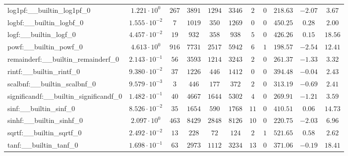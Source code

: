 \begin{tabular}{|l|c|c|c|c|c|c|c|c|c|c|}
log1pf:\_\_builtin\_log1pf\_0             & $ 1.221 \cdot 10^{0}  $ & $ 267    $ & $ 3891   $ & $ 1294  $ & $ 3346   $ & $ 2   $ & $ 0 $ & $ 218.63      $ & $ -2.07   $ & $ 3.67    $ \\
logbf:\_\_builtin\_logbf\_0               & $ 1.555 \cdot 10^{-2} $ & $ 7      $ & $ 1019   $ & $ 350   $ & $ 1269   $ & $ 0   $ & $ 0 $ & $ 450.25      $ & $ 0.28    $ & $ 2.00    $ \\
logf:\_\_builtin\_logf\_0                 & $ 4.457 \cdot 10^{-2} $ & $ 19     $ & $ 932    $ & $ 358   $ & $ 938    $ & $ 5   $ & $ 0 $ & $ 426.26      $ & $ 0.15    $ & $ 18.56   $ \\
powf:\_\_builtin\_powf\_0                 & $ 4.613 \cdot 10^{0}  $ & $ 916    $ & $ 7731   $ & $ 2517  $ & $ 5942   $ & $ 6   $ & $ 1 $ & $ 198.57      $ & $ -2.54   $ & $ 12.41   $ \\
remainderf:\_\_builtin\_remainderf\_0     & $ 2.143 \cdot 10^{-1} $ & $ 56     $ & $ 3593   $ & $ 1214  $ & $ 3243   $ & $ 2   $ & $ 0 $ & $ 261.37      $ & $ -1.33   $ & $ 3.32    $ \\
rintf:\_\_builtin\_rintf\_0               & $ 9.380 \cdot 10^{-2} $ & $ 37     $ & $ 1226   $ & $ 446   $ & $ 1412   $ & $ 0   $ & $ 0 $ & $ 394.48      $ & $ -0.04   $ & $ 2.43    $ \\
scalbnf:\_\_builtin\_scalbnf\_0           & $ 9.579 \cdot 10^{-3} $ & $ 3      $ & $ 446    $ & $ 177   $ & $ 372    $ & $ 2   $ & $ 0 $ & $ 313.19      $ & $ -0.69   $ & $ 2.41    $ \\
significandf:\_\_builtin\_significandf\_0 & $ 1.482 \cdot 10^{-1} $ & $ 40     $ & $ 4667   $ & $ 1644  $ & $ 5302   $ & $ 4   $ & $ 0 $ & $ 269.91      $ & $ -1.21   $ & $ 3.59    $ \\
sinf:\_\_builtin\_sinf\_0                 & $ 8.526 \cdot 10^{-2} $ & $ 35     $ & $ 1654   $ & $ 590   $ & $ 1768   $ & $ 11  $ & $ 0 $ & $ 410.51      $ & $ 0.06    $ & $ 14.73   $ \\
sinhf:\_\_builtin\_sinhf\_0               & $ 2.097 \cdot 10^{0}  $ & $ 463    $ & $ 8429   $ & $ 2848  $ & $ 8126   $ & $ 10  $ & $ 0 $ & $ 220.75      $ & $ -2.03   $ & $ 6.96    $ \\
sqrtf:\_\_builtin\_sqrtf\_0               & $ 2.492 \cdot 10^{-2} $ & $ 13     $ & $ 228    $ & $ 72    $ & $ 124    $ & $ 2   $ & $ 1 $ & $ 521.65      $ & $ 0.58    $ & $ 2.62    $ \\
tanf:\_\_builtin\_tanf\_0                 & $ 1.698 \cdot 10^{-1} $ & $ 63     $ & $ 2973   $ & $ 1112  $ & $ 3234   $ & $ 13  $ & $ 0 $ & $ 371.06      $ & $ -0.19   $ & $ 18.41   $ \\

\end{tabular}
